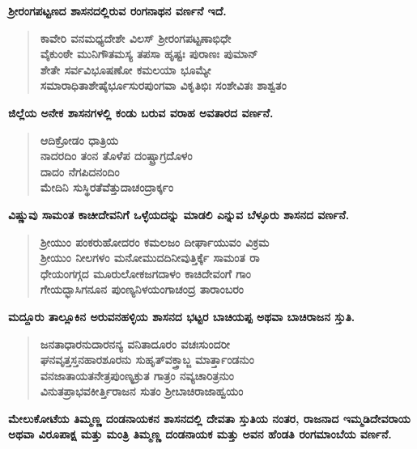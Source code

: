 \noindent
\textbf{ಶ‍್ರೀರಂಗಪಟ್ಟಣದ ಶಾಸನದಲ್ಲಿರುವ ರಂಗನಾಥನ ವರ್ಣನೆ ಇದೆ.}

\begin{verse}
\textbf{ಕಾವೇರಿ ವನಮಧ್ಯದೇಶೇ ವಿಲಸ್​ ಶ‍್ರೀರಂಗಪಟ್ಟಣಾಭಿಧೇ \\ ವೈಕುಂಠೇ ಮುನಿಗೌತಮಸ್ಯ ತಪಸಾ ಹೃಷ್ಟಃ ಪುರಾಣಃ ಪುಮಾನ್​ \\ ಶೇತೇ ಸರ್ವವಿಭೂಷಣೋ ಕಮಲಯಾ ಭೂಮ್ಯೇ \\ ಸಮಾರಾಧಿತಾಶೇಷೈರ್ಭೂಸುರಪುಂಗವಾ ವಿಕೃತಿಭಿಃ ಸಂಶೇವಿತಃ ಶಾಶ್ವತಂ}
\end{verse}

\noindent
\textbf{ಜಿಲ್ಲೆಯ ಅನೇಕ ಶಾಸನಗಳಲ್ಲಿ ಕಂಡು ಬರುವ ವರಾಹ ಅವತಾರದ ವರ್ಣನೆ.}

\begin{verse}
\textbf{ಆದಿಕ್ರೋಡಂ ಧಾತ್ರಿಯ \\ ನಾದರದಿಂ ತಂನ ತೊಳೆಪ ದಂಷ್ಟ್ರಾಗ್ರದೊಳಂ \\ ದಾದಂ ನೆಗಪಿದನಂದಿಂ \\ ಮೇದಿನಿ ಸುಸ್ಥಿರತೆವೆತ್ತುದಾಚಂದ್ರಾರ್ಕ್ಕಂ}
\end{verse}

\noindent
\textbf{ವಿಷ್ಣುವು ಸಾಮಂತ ಕಾಚೀದೇವನಿಗೆ ಒಳ್ಳೆಯದನ್ನು ಮಾಡಲಿ ಎನ್ನುವ ಬೆಳ್ಳೂರು ಶಾಸನದ ವರ್ಣನೆ.}

\begin{verse}
\textbf{ಶ‍್ರೀಯುಂ ಪಂಕರುಹೋದರಂ ಕಮಲಜಂ ದೀರ್ಘಾಯುವಂ ವಿಕ್ರಮ \\ ಶ‍್ರೀಯುಂ ನೀಲಗಳಂ ಮನೋಮುದದಿನೀವುತ್ತಿರ್ಕ್ಕೆ ಸಾಮಂತ ರಾ \\ ಧೇಯಂಗಗ್ಗದ ಮೂರುಲೋಕಜಗದಾಳಂ ಕಾಚಿದೇವಂಗೆ ಗಾಂ \\ ಗೇಯದ್ಭಾಸಿಗನೂನ ಪುಂಣ್ಯನಿಳಯಂಗಾಚಂದ್ರ ತಾರಾಂಬರಂ}
\end{verse}

\noindent
\textbf{ಮದ್ದೂರು ತಾಲ್ಲೂಕಿನ ಅರುವನಹಳ್ಳಿಯ ಶಾಸನದ ಭಟ್ಟರ ಬಾಚಿಯಪ್ಪ ಅಥವಾ ಬಾಚಿರಾಜನ ಸ್ತುತಿ.}

\begin{verse}
\textbf{ಜನತಾಧಾರನುದಾರನನ್ಯ ವನಿತಾದೂರಂ ವಚಃಸುಂದರೀ\\ ಘನವೃತ್ತಸ್ತನಹಾರಶೂರನು ಸುಹೃತ್​ವಕ್ತ್ರಾಬ್ಜ ಮಾರ್ತ್ತಾಂಡನುಂ \\ ವನಜಾತಾಯತನೇತ್ರಪುಂಣ್ಯಕ್ರುತ ಗಾತ್ರಂ ನವ್ಯಚಾರಿತ್ರನುಂ \\ ವಿನುತಪ್ರಾಭವಕೀರ್ತ್ತಿರಾಜನ ಸುತಂ ಶ‍್ರೀಬಾಚಿರಾಜಾಹ್ವಯಂ}
\end{verse}

\noindent
\textbf{ಮೇಲುಕೋಟೆಯ ತಿಮ್ಮಣ್ಣ ದಂಡನಾಯಕನ ಶಾಸನದಲ್ಲಿ ದೇವತಾ ಸ್ತುತಿಯ ನಂತರ, ರಾಜನಾದ ಇಮ್ಮಡಿದೇವರಾಯ ಅಥವಾ ವಿರೂಪಾಕ್ಷ ಮತ್ತು ಮಂತ್ರಿ ತಿಮ್ಮಣ್ಣ ದಂಡನಾಯಕ ಮತ್ತು ಅವನ ಹೆಂಡತಿ ರಂಗಮಾಂಬೆಯ ವರ್ಣನೆ.}

